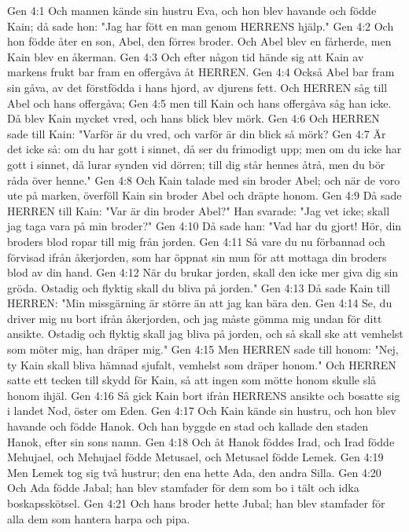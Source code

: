 Gen 4:1  Och mannen kände sin hustru Eva, och hon blev havande och födde Kain; då sade hon: "Jag har fött en man genom HERRENS hjälp."
Gen 4:2  Och hon födde åter en son, Abel, den förres broder. Och Abel blev en fårherde, men Kain blev en åkerman.
Gen 4:3  Och efter någon tid hände sig att Kain av markens frukt bar fram en offergåva åt HERREN.
Gen 4:4  Också Abel bar fram sin gåva, av det förstfödda i hans hjord, av djurens fett. Och HERREN såg till Abel och hans offergåva;
Gen 4:5  men till Kain och hans offergåva såg han icke. Då blev Kain mycket vred, och hans blick blev mörk.
Gen 4:6  Och HERREN sade till Kain: "Varför är du vred, och varför är din blick så mörk?
Gen 4:7  Är det icke så: om du har gott i sinnet, då ser du frimodigt upp; men om du icke har gott i sinnet, då lurar synden vid dörren; till dig står hennes åtrå, men du bör råda över henne."
Gen 4:8  Och Kain talade med sin broder Abel; och när de voro ute på marken, överföll Kain sin broder Abel och dräpte honom.
Gen 4:9  Då sade HERREN till Kain: "Var är din broder Abel?" Han svarade: "Jag vet icke; skall jag taga vara på min broder?"
Gen 4:10  Då sade han: "Vad har du gjort! Hör, din broders blod ropar till mig från jorden.
Gen 4:11  Så vare du nu förbannad och förvisad ifrån åkerjorden, som har öppnat sin mun för att mottaga din broders blod av din hand.
Gen 4:12  När du brukar jorden, skall den icke mer giva dig sin gröda. Ostadig och flyktig skall du bliva på jorden."
Gen 4:13  Då sade Kain till HERREN: "Min missgärning är större än att jag kan bära den.
Gen 4:14  Se, du driver mig nu bort ifrån åkerjorden, och jag måste gömma mig undan för ditt ansikte. Ostadig och flyktig skall jag bliva på jorden, och så skall ske att vemhelst som möter mig, han dräper mig."
Gen 4:15  Men HERREN sade till honom: "Nej, ty Kain skall bliva hämnad sjufalt, vemhelst som dräper honom." Och HERREN satte ett tecken till skydd för Kain, så att ingen som mötte honom skulle slå honom ihjäl.
Gen 4:16  Så gick Kain bort ifrån HERRENS ansikte och bosatte sig i landet Nod, öster om Eden.
Gen 4:17  Och Kain kände sin hustru, och hon blev havande och födde Hanok. Och han byggde en stad och kallade den staden Hanok, efter sin sons namn.
Gen 4:18  Och åt Hanok föddes Irad, och Irad födde Mehujael, och Mehujael födde Metusael, och Metusael födde Lemek.
Gen 4:19  Men Lemek tog sig två hustrur; den ena hette Ada, den andra Silla.
Gen 4:20  Och Ada födde Jabal; han blev stamfader för dem som bo i tält och idka boskapsskötsel.
Gen 4:21  Och hans broder hette Jubal; han blev stamfader för alla dem som hantera harpa och pipa.
